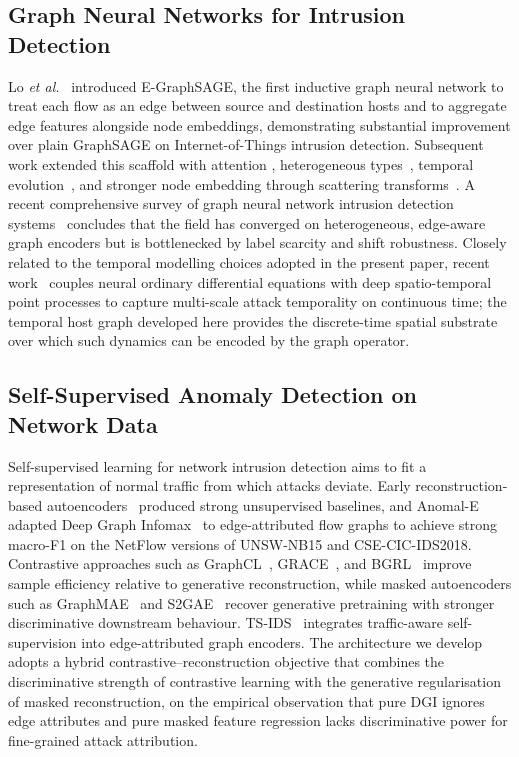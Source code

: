 \documentclass{ieeeaccess}
\begin{document}
\subsection{Graph Neural Networks for Intrusion Detection}
Lo \emph{et al.}~\cite{lo2022egraphsage} introduced E-GraphSAGE, the first
inductive graph neural network to treat each flow as an edge between source
and destination hosts and to aggregate edge features alongside node
embeddings, demonstrating substantial improvement over plain GraphSAGE
\cite{hamilton2017graphsage} on Internet-of-Things intrusion detection.
Subsequent work extended this scaffold with attention
\cite{caville2022anomale}, heterogeneous types~\cite{hu2020hgt}, temporal
evolution~\cite{rossi2020tgn}, and stronger node embedding through scattering
transforms~\cite{bilot2023survey}. A recent comprehensive survey of graph
neural network intrusion detection systems~\cite{bilot2023survey}
concludes that the field has converged on heterogeneous, edge-aware graph
encoders but is bottlenecked by label scarcity and shift robustness.
Closely related to the temporal modelling choices adopted in the present
paper, recent work~\cite{anaedevha2026neuralode} couples neural ordinary
differential equations with deep spatio-temporal point processes to capture
multi-scale attack temporality on continuous time; the temporal host graph
developed here provides the discrete-time spatial substrate over which such
dynamics can be encoded by the graph operator.

\subsection{Self-Supervised Anomaly Detection on Network Data}
Self-supervised learning for network intrusion detection aims to fit a
representation of normal traffic from which attacks deviate. Early
reconstruction-based autoencoders~\cite{mirsky2018kitsune} produced strong
unsupervised baselines, and Anomal-E~\cite{caville2022anomale} adapted Deep
Graph Infomax~\cite{velickovic2019dgi} to edge-attributed flow graphs to
achieve strong macro-F1 on the NetFlow versions of UNSW-NB15 and
CSE-CIC-IDS2018. Contrastive
approaches such as GraphCL~\cite{you2020graphcl}, GRACE~\cite{zhu2020grace},
and BGRL~\cite{thakoor2022bgrl} improve sample efficiency relative to
generative reconstruction, while masked autoencoders such as
GraphMAE~\cite{hou2022graphmae} and S2GAE~\cite{tan2023s2gae} recover
generative pretraining with stronger discriminative downstream behaviour.
TS-IDS~\cite{nguyen2023tsids} integrates traffic-aware self-supervision into
edge-attributed graph encoders. The architecture we develop adopts a
hybrid contrastive--reconstruction objective that combines the discriminative
strength of contrastive learning with the generative regularisation of
masked reconstruction, on the empirical observation that pure DGI ignores
edge attributes and pure masked feature regression lacks discriminative
power for fine-grained attack attribution.
\end{document}
